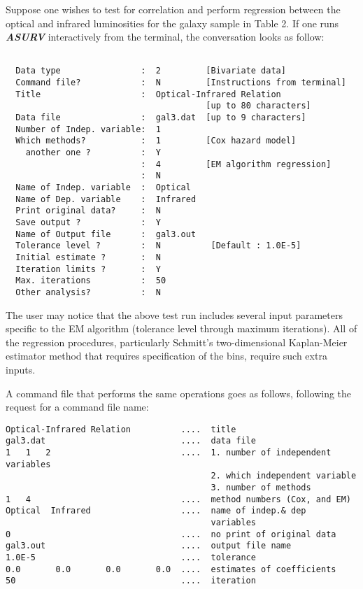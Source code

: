 \bigskip
\bigskip
{}

       Suppose one wishes to test for correlation and perform regression
between the optical and infrared luminosities for the galaxy sample in
Table 2. If one  runs {\sl\bf ASURV} interactively from the terminal, the
conversation looks as follow:
\begin{verbatim} 

  Data type                :  2         [Bivariate data]
  Command file?            :  N         [Instructions from terminal]
  Title                    :  Optical-Infrared Relation 
                                        [up to 80 characters]
  Data file                :  gal3.dat  [up to 9 characters]
  Number of Indep. variable:  1
  Which methods?           :  1         [Cox hazard model]
    another one ?          :  Y
                           :  4         [EM algorithm regression] 
                           :  N
  Name of Indep. variable  :  Optical
  Name of Dep. variable    :  Infrared
  Print original data?     :  N
  Save output ?            :  Y
  Name of Output file      :  gal3.out 
  Tolerance level ?        :  N          [Default : 1.0E-5]
  Initial estimate ?       :  N
  Iteration limits ?       :  Y 
  Max. iterations          :  50
  Other analysis?          :  N
\end{verbatim} 

     The user may notice that the above test run includes several input
parameters specific to the EM algorithm (tolerance level through maximum 
iterations).  All of the regression procedures, particularly  Schmitt's
two-dimensional Kaplan-Meier estimator method that requires specification 
of the bins, require such extra inputs.  

     A command file that performs the same operations goes as follows, 
following the request for a command file name:
\begin{verbatim} 
Optical-Infrared Relation          ....  title     
gal3.dat                           ....  data file    
1   1   2                          ....  1. number of independent variables
                                         2. which independent variable
                                         3. number of methods
1   4                              ....  method numbers (Cox, and EM) 
Optical  Infrared                  ....  name of indep.& dep
                                         variables
0                                  ....  no print of original data
gal3.out                           ....  output file name 
1.0E-5                             ....  tolerance  
0.0       0.0       0.0       0.0  ....  estimates of coefficients
50                                 ....  iteration  
\end{verbatim} 


